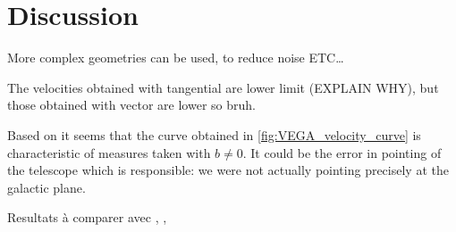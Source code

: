 \section{Discussion}
More complex geometries can be used, to reduce noise ETC\ldots \cite{burke_introduction_2013}

The velocities obtained with tangential are lower limit (EXPLAIN WHY), but those obtained with vector are lower so bruh.

Based on \cite{sakhawat_hossain_salsa_2018} it seems that the curve obtained in \autoref{fig:VEGA_velocity_curve} is characteristic of measures taken with $b \neq 0$. It could be the error in pointing of the telescope which is responsible: we were not actually pointing precisely at the galactic plane.

Resultats à comparer avec \cite{ou_dark_2024}, \cite{jia_research_2022}, \cite{mroz_rotation_2019}
